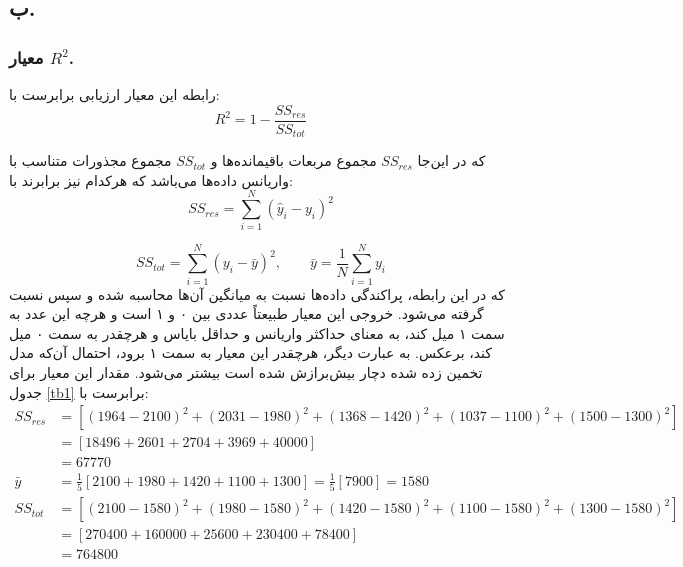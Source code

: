 \begin{redtext}
\subsection{ب.}
	\subsubsection{معیار $R^2$.}
	رابطه این معیار ارزیابی برابرست با:
	\begin{equation}
			R^2 = 1 - \frac{SS_{res}}{SS_{tot}}
		\label{eq2}
	\end{equation}
	
	که در این‌جا $SS_{res}$ مجموع مربعات باقیمانده‌ها و $SS_{tot}$ مجموع مجذورات متناسب با واریانس داده‌ها می‌باشد که هرکدام نیز برابرند با:
	\begin{equation}
		SS_{res} = \sum_{i=1}^{N} (\hat{y}_i - y_i)^2
		\label{eq3}
	\end{equation}	
	
	\begin{equation}
		SS_{tot} = \sum_{i=1}^{N} (y_i - \bar{y})^2, \quad\quad \bar{y} = \frac{1}{N} \sum_{i=1}^{N} y_i
		\label{eq4}
	\end{equation}	
	که در این رابطه، پراکندگی داده‌ها نسبت به میانگین آن‌ها محاسبه شده و سپس نسبت گرفته می‌شود. خروجی این معیار طبیعتاً عددی بین ۰ و ۱ است و هرچه این عدد به سمت ۱ میل کند، به معنای حداکثر واریانس و حداقل بایاس و هرچقدر به سمت ۰ میل کند، برعکس. به عبارت دیگر، هرچقدر این معیار به سمت ۱ برود، احتمال آن‌که مدل تخمین زده شده دچار بیش‌برازش شده است بیشتر می‌شود. مقدار این معیار برای جدول \ref{tb1} برابرست با:
	\begin{equation*}
		\begin{aligned}
			SS_{res} & = [ (1964 - 2100)^2 + (2031 - 1980)^2 + (1368 - 1420)^2 + (1037 - 1100)^2 + (1500 - 1300)^2 ] \\
			& =  [ 18496 + 2601 + 2704 + 3969 + 40000 ] \\
			& =  67770 \\
			\bar{y} & = \frac{1}{5}[ 2100 + 1980 + 1420 + 1100 + 1300] = \frac{1}{5}[7900] = 1580 \\
			SS_{tot} & = [ (2100 - 1580)^2 + (1980 - 1580)^2 + (1420 - 1580)^2 + (1100 - 1580)^2 + (1300 - 1580)^2 ] \\
			& =  [ 270400 + 160000 + 25600 + 230400 + 78400 ] \\
			& =  764800 \\
		\end{aligned}
	\end{equation*}
	

\end{redtext}
